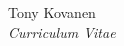 \documentclass[10pt]{article}
\begin{document}
\begin{cv}{Tony Kovanen\\{\large \itshape Curriculum Vitae}}



\end{cv}
\end{document}
